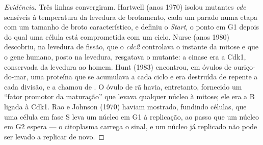 \begin{proof}[Evidência]
Três linhas convergiram. Hartwell (anos 1970) isolou mutantes
\emph{cdc} sensíveis à temperatura da levedura de brotamento, cada um
parado numa etapa com um tamanho de broto característico, e definiu o
\emph{Start}, o ponto em G1 depois do qual uma célula está comprometida
com um ciclo. Nurse (anos 1980) descobriu, na levedura de fissão, que o
\emph{cdc2} controlava o instante da mitose e que o gene humano, posto
na levedura, resgatava o mutante: a cinase era a Cdk1, conservada da
levedura ao homem. Hunt (1983) encontrou, em óvulos de ouriço-do-mar,
uma proteína que se acumulava a cada ciclo e era destruída de repente a
cada divisão, e a chamou de . O óvulo de rã havia, entretanto,
fornecido um ``fator promotor da maturação'' que levava qualquer núcleo
à mitose; ele era a  B ligada à Cdk1. Rao e Johnson (1970)
haviam mostrado, fundindo células, que uma célula em fase S leva um
núcleo em G1 à replicação, ao passo que um núcleo em G2 espera --- o
citoplasma carrega o sinal, e um núcleo já replicado não pode ser
levado a replicar de novo.
\end{proof}

